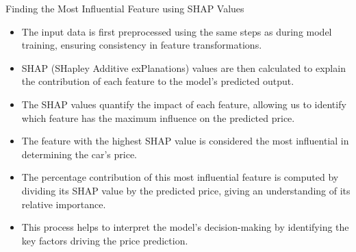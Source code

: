 \documentclass{beamer}
\begin{document}
\begin{frame}{Finding the Most Influential Feature using SHAP Values}
    \begin{itemize}
        \item The input data is first preprocessed using the same steps as during model training, ensuring consistency in feature transformations.
        \item SHAP (SHapley Additive exPlanations) values are then calculated to explain the contribution of each feature to the model’s predicted output.
        \item The SHAP values quantify the impact of each feature, allowing us to identify which feature has the maximum influence on the predicted price.
        \item The feature with the highest SHAP value is considered the most influential in determining the car's price.
        \item The percentage contribution of this most influential feature is computed by dividing its SHAP value by the predicted price, giving an understanding of its relative importance.
        \item This process helps to interpret the model’s decision-making by identifying the key factors driving the price prediction.
    \end{itemize}
\end{frame}
\end{document}
